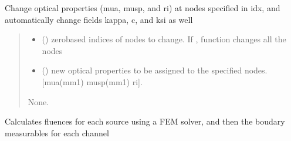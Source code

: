 \documentclass[letterpaper,10pt,english]{sphinxmanual}
\begin{document}
\begin{fulllineitems}
\begin{fulllineitems}
\label{\detokenize{_autosummary/nirfasterff.base.stnd_mesh.stndmesh:nirfasterff.base.stnd_mesh.stndmesh.change_prop}}
\pysigstartsignatures
\pysiglinewithargsret
{}
{\sphinxparamcomma {}}
{}
\pysigstopsignatures
\sphinxAtStartPar
Change optical properties (mua, musp, and ri) at nodes specified in idx, and automatically change fields kappa, c, and ksi as well
\begin{quote}\begin{description}
\begin{itemize}
\item {} 
\sphinxAtStartPar
{} () \textendash{} zero\sphinxhyphen{}based indices of nodes to change. If , function changes all the nodes

\item {} 
\sphinxAtStartPar
{} () \textendash{} new optical properties to be assigned to the specified nodes. {[}mua(mm\sphinxhyphen{}1) musp(mm\sphinxhyphen{}1) ri{]}.

\end{itemize}

\sphinxAtStartPar
None.

\end{description}\end{quote}

\end{fulllineitems}


\begin{fulllineitems}
\label{\detokenize{_autosummary/nirfasterff.base.stnd_mesh.stndmesh:nirfasterff.base.stnd_mesh.stndmesh.femdata}}
\pysigstartsignatures
\pysiglinewithargsret
{}
{\sphinxparamcomma {}\sphinxparamcomma {}}
{}
\pysigstopsignatures
\sphinxAtStartPar
Calculates fluences for each source using a FEM solver, and then the boudary measurables for each channel


\end{fulllineitems}
\end{fulllineitems}
\end{document}
